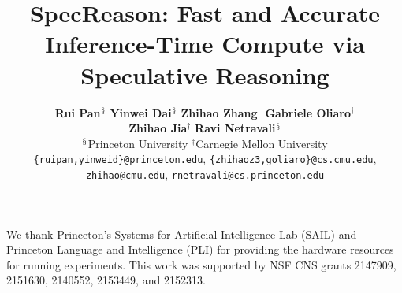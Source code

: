 \documentclass{article}
\title{SpecReason: Fast and Accurate Inference-Time Compute via Speculative Reasoning}
\author{
  \textbf{Rui Pan}$^{\mathsection}$
  \quad
  \textbf{Yinwei Dai}$^{\mathsection}$
  \quad
  \textbf{Zhihao Zhang}$^{\dag}$
  \quad
  \textbf{Gabriele Oliaro}$^{\dag}$
  \\
  \textbf{Zhihao Jia}$^{\dag}$
  \quad
  \textbf{Ravi Netravali}$^{\mathsection}$
  \\
  ${}^\mathsection$Princeton University \quad 
  ${}^\dag$Carnegie Mellon University\\
    \texttt{\{ruipan,yinweid\}@princeton.edu}, \texttt{\{zhihaoz3,goliaro\}@cs.cmu.edu},\\
    \texttt{zhihao@cmu.edu}, \texttt{rnetravali@cs.princeton.edu}
}
\begin{document}
\maketitle


\begin{abstract}

\end{abstract}












\begin{ack}
We thank Princeton's Systems for Artificial Intelligence Lab (SAIL) and Princeton Language and Intelligence (PLI) for providing the hardware resources for running experiments. This work was supported by NSF CNS grants 2147909, 2151630,
2140552, 2153449, and 2152313.
\end{ack}






{
\small


}



\appendix


\end{document}
